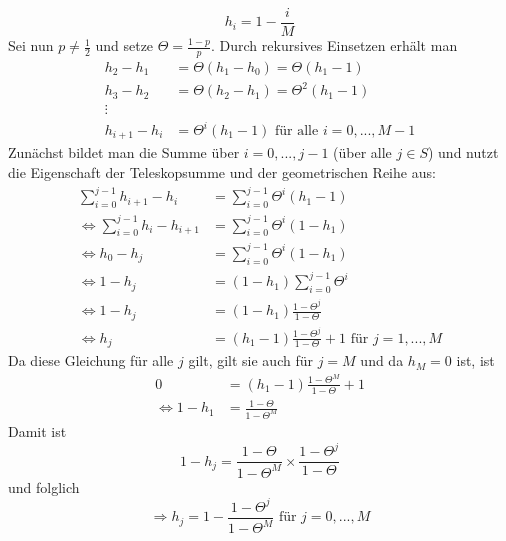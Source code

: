 \documentclass[a4paper,12pt]{article}
\begin{document}
\begin{tcolorbox}[breakable, colframe=blue, colback=white, title=Beispiel 9]
$$
h_i = 1 - \frac{i}{M}
$$
Sei nun $p \neq \frac{1}{2}$ und setze $\Theta = \frac{1-p}{p}$. Durch rekursives Einsetzen erhält man
\begin{align*}
h_2 - h_1 & = \Theta (h_1 - h_0) = \Theta (h_1 - 1) \\
h_3 - h_2 & = \Theta (h_2 - h_1) = \Theta^2 (h_1 - 1)\\
\vdots & \\
h_{i+1} - h_i & = \Theta^{i}(h_1 - 1) \text{ für alle } i = 0, ..., M-1
\end{align*}
Zunächst bildet man die Summe über $i=0, ..., j-1$ (über alle $j \in S$) und nutzt die Eigenschaft der Teleskopsumme und der geometrischen Reihe aus:
\begin{align*}
\sum_{i=0}^{j-1} h_{i+1} - h_i & = \sum_{i=0}^{j-1}\Theta^{i}(h_1 - 1) \\
\Leftrightarrow\sum_{i=0}^{j-1} h_i - h_{i+1} & = \sum_{i=0}^{j-1}\Theta^{i}(1 - h_1) \\
\Leftrightarrow   h_0 - h_{j} & =  \sum_{i=0}^{j-1}\Theta^{i}(1 - h_1) \\
\Leftrightarrow 1 - h_{j} & =  (1 - h_1)\sum_{i=0}^{j-1}\Theta^{i} \\
\Leftrightarrow 1 - h_{j} & =  (1 - h_1)\frac{1-\Theta^{j}}{1- \Theta}  \\
\Leftrightarrow h_{j} & =  ( h_1 - 1)\frac{1-\Theta^{j}}{1- \Theta} +1  \text{ für } j = 1, ..., M
\end{align*}
Da diese Gleichung für alle $j$ gilt, gilt sie auch für $j=M$ und da $h_M = 0$ ist, ist 
\begin{align*}
0 & = ( h_1 - 1)\frac{1-\Theta^{M}}{1- \Theta} +1 \\
\Leftrightarrow 1- h_1 &= \frac{1- \Theta}{1- \Theta^M}
\end{align*}
Damit ist 
$$
1 - h_j = \frac{1- \Theta}{1- \Theta^M} \times \frac{1- \Theta^j}{1- \Theta}
$$
und  folglich
$$
\Rightarrow h_j = 1 - \frac{1 - \Theta^{j}}{1-\Theta^{M}} \text{ für } j = 0, ..., M
$$
\end{tcolorbox}
\end{document}

